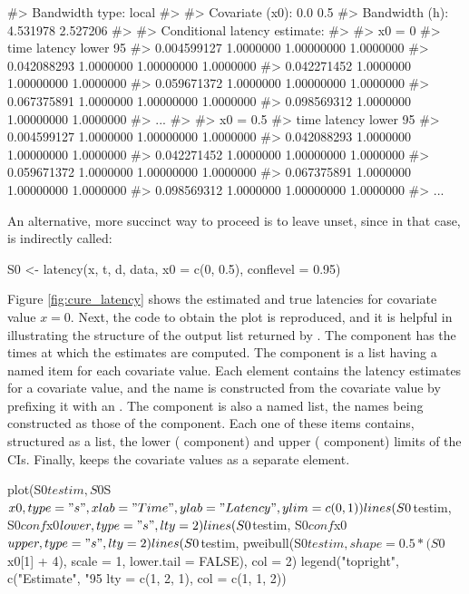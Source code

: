 \begin{example}
#> Bandwidth type: local
#>
#> Covariate (x0): 0.0 0.5
#> Bandwidth (h):  4.531978 2.527206 
#>
#> Conditional latency estimate:
#>
#> x0 = 0 
#>        time   latency lower 95%
#> 0.004599127 1.0000000   1.00000000    1.0000000
#> 0.042088293 1.0000000   1.00000000    1.0000000
#> 0.042271452 1.0000000   1.00000000    1.0000000
#> 0.059671372 1.0000000   1.00000000    1.0000000
#> 0.067375891 1.0000000   1.00000000    1.0000000
#> 0.098569312 1.0000000   1.00000000    1.0000000
#> ...
#> 
#> x0 = 0.5 
#>        time   latency lower 95%
#> 0.004599127 1.0000000   1.00000000    1.0000000
#> 0.042088293 1.0000000   1.00000000    1.0000000
#> 0.042271452 1.0000000   1.00000000    1.0000000
#> 0.059671372 1.0000000   1.00000000    1.0000000
#> 0.067375891 1.0000000   1.00000000    1.0000000
#> 0.098569312 1.0000000   1.00000000    1.0000000
#> ...
\end{example}

An alternative, more succinct way to proceed is to leave  unset, since in that case,  is indirectly called:

\begin{example}
S0 <- latency(x, t, d, data, x0 = c(0, 0.5), conflevel = 0.95)
\end{example}

Figure \ref{fig:cure_latency} shows the estimated and true latencies for covariate value $x=0$. Next, the code to obtain the plot is reproduced, and it is helpful in illustrating the structure of the output list returned by . The  component has the times at which the estimates are computed. The  component is a list having a named item for each covariate value. Each element contains the latency estimates for a covariate value, and the name is constructed from the covariate value by prefixing it with an . The  component is also a named list, the names being constructed as those of the  component. Each one of these items contains, structured as a list, the lower ( component) and upper ( component) limits of the CIs. Finally,  keeps the covariate values as a separate element.

\begin{example}
plot(S0$testim, S0$S$x0, type = "s", xlab = "Time", ylab = "Latency",
   ylim = c(0, 1))
lines(S0$testim, S0$conf$x0$lower, type = "s", lty = 2)
lines(S0$testim, S0$conf$x0$upper, type = "s", lty = 2)
lines(S0$testim, pweibull(S0$testim, shape = 0.5 * (S0$x0[1] + 4), 
   scale = 1, lower.tail = FALSE), col = 2)
legend("topright", c("Estimate", "95%
   lty = c(1, 2, 1), col = c(1, 1, 2))
\end{example}


